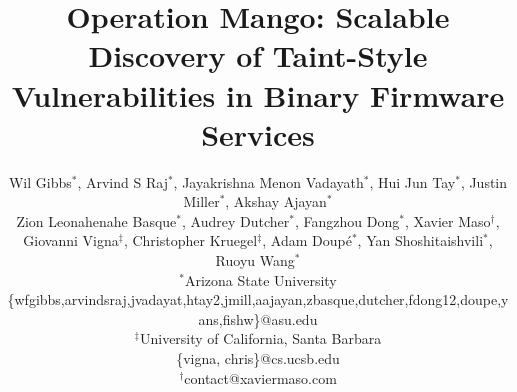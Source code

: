 \documentclass[letterpaper,twocolumn,10pt]{article}
\newcommand{\asu}{Arizona State University}
\newcommand{\ucsb}{University of California, Santa Barbara}
\newcommand{\mango}{Mango\xspace}
\begin{document}
\date{}

\title{Operation \mango: Scalable Discovery of Taint-Style\\ Vulnerabilities in Binary Firmware Services} %

\author{
    {\rm Wil Gibbs$^\ast$, 
    Arvind S Raj$^\ast$, 
    Jayakrishna Menon Vadayath$^\ast$, 
    Hui Jun Tay$^\ast$, 
    Justin Miller$^\ast$,
    Akshay Ajayan$^\ast$
    }\\
    {\rm
    Zion Leonahenahe Basque$^\ast$,
    Audrey Dutcher$^\ast$, 
    Fangzhou Dong$^\ast$,
    Xavier Maso$^\dagger$,
    }\\
    {\rm
    Giovanni Vigna$^\ddagger$, 
    Christopher Kruegel$^\ddagger$,
    Adam Doupé$^\ast$, 
    Yan Shoshitaishvili$^\ast$, 
    Ruoyu Wang$^\ast$
    }
    \vspace{0.5em}
    \\
    $^\ast$\asu\\
     \{wfgibbs,arvindsraj,jvadayat,htay2,jmill,aajayan,zbasque,dutcher,fdong12,doupe,yans,fishw\}@asu.edu\\
    $^\ddag$\ucsb\\
     \{vigna, chris\}@cs.ucsb.edu\\
    $^\dagger$contact@xaviermaso.com
}






\maketitle

\begin{abstract}

\end{abstract}




















\appendix

\end{document}
